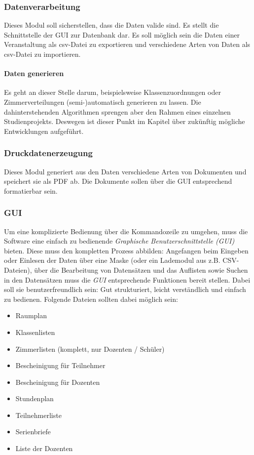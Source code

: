 \documentclass[a4paper]{scrartcl}
\begin{document}
	\subsubsection{Datenverarbeitung}
	Dieses Modul soll sicherstellen, dass die Daten valide sind. Es stellt die Schnittstelle der GUI zur Datenbank dar. Es soll möglich sein die Daten einer Veranstaltung als csv-Datei zu exportieren und verschiedene Arten von Daten als csv-Datei zu importieren.
	
	\paragraph{Daten generieren}
	Es geht an dieser Stelle darum, beispielsweise Klassenzuordnungen oder Zimmerverteilungen (semi-)automatisch generieren zu lassen. Die dahinterstehenden Algorithmen sprengen aber den Rahmen eines einzelnen Studienprojekts. Deswegen ist dieser Punkt im Kapitel über zukünftig mögliche Entwicklungen aufgeführt.
	
	\subsubsection{Druckdatenerzeugung}
	Dieses Modul generiert aus den Daten verschiedene Arten von Dokumenten und speichert sie als PDF ab. Die Dokumente sollen über die GUI entsprechend formatierbar sein.
	
	\subsubsection{GUI}
	Um eine komplizierte Bedienung über die Kommandozeile zu umgehen, muss die Software eine einfach zu bedienende \emph{Graphische Benutzerschnittstelle (GUI)} bieten. Diese muss den kompletten Prozess abbilden: Angefangen beim Eingeben oder Einlesen der Daten über eine Maske (oder ein Lademodul aus z.B. CSV-Dateien), über die Bearbeitung von Datensätzen und das Auflisten sowie Suchen in den Datensätzen muss die \emph{GUI} entsprechende Funktionen bereit stellen. Dabei soll sie benutzerfreundlich sein: Gut strukturiert, leicht verständlich und einfach zu bedienen. Folgende Dateien sollten dabei möglich sein:
	
	\begin{itemize}
		\item Raumplan
		\item Klassenlisten
		\item Zimmerlisten (komplett, nur Dozenten / Schüler)
		\item Bescheinigung für Teilnehmer
		\item Bescheinigung für Dozenten
		\item Stundenplan
		\item Teilnehmerliste
		\item Serienbriefe
		\item Liste der Dozenten
	\end{itemize}
	
\end{document}

